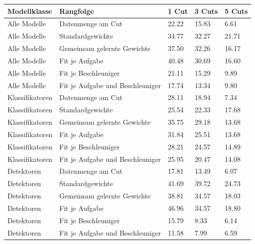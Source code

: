 \begin{tabular}{@{}lllll@{}}
\toprule
Modellklasse & Rangfolge & 1 Cut & 3 Cuts & 5 Cuts \\
\midrule
Alle Modelle & Datenmenge am Cut & 22.22 & 15.83 & 6.61 \\
Alle Modelle & Standardgewichte & 34.77 & 32.27 & 21.71 \\
Alle Modelle & Gemeinsam gelernte Gewichte & 37.50 & 32.26 & 16.17 \\
Alle Modelle & Fit je Aufgabe & 40.48 & 30.69 & 16.60 \\
Alle Modelle & Fit je Beschleuniger & 21.11 & 15.29 & 9.89 \\
Alle Modelle & Fit je Aufgabe und Beschleuniger & 17.74 & 13.34 & 9.80 \\
Klassifikatoren & Datenmenge am Cut & 28.11 & 18.94 & 7.34 \\
Klassifikatoren & Standardgewichte & 25.54 & 22.33 & 17.68 \\
Klassifikatoren & Gemeinsam gelernte Gewichte & 35.75 & 29.18 & 13.68 \\
Klassifikatoren & Fit je Aufgabe & 31.84 & 25.51 & 13.68 \\
Klassifikatoren & Fit je Beschleuniger & 28.21 & 24.57 & 14.89 \\
Klassifikatoren & Fit je Aufgabe und Beschleuniger & 25.95 & 20.47 & 14.08 \\
Detektoren & Datenmenge am Cut & 17.81 & 13.49 & 6.07 \\
Detektoren & Standardgewichte & 41.69 & 39.72 & 24.73 \\
Detektoren & Gemeinsam gelernte Gewichte & 38.81 & 34.57 & 18.03 \\
Detektoren & Fit je Aufgabe & 46.96 & 34.57 & 18.80 \\
Detektoren & Fit je Beschleuniger & 15.79 & 8.33 & 6.14 \\
Detektoren & Fit je Aufgabe und Beschleuniger & 11.58 & 7.99 & 6.59 \\
\bottomrule
\end{tabular}
